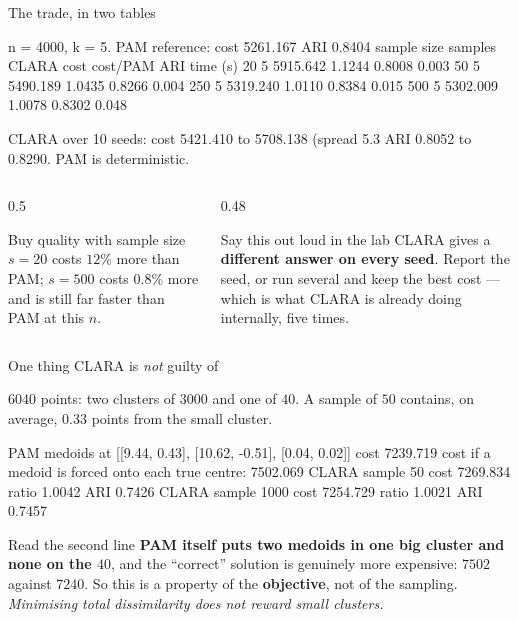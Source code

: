 \documentclass[aspectratio=169]{beamer}
\begin{document}
\begin{frame}[fragile,shrink=8]{The trade, in two tables}
\begin{outblk}
  n = 4000, k = 5.  PAM reference: cost 5261.167   ARI 0.8404
  sample size   samples   CLARA cost   cost/PAM     ARI    time (s)
           20         5     5915.642     1.1244  0.8008     0.003
           50         5     5490.189     1.0435  0.8266     0.004
          250         5     5319.240     1.0110  0.8384     0.015
          500         5     5302.009     1.0078  0.8302     0.048

  CLARA over 10 seeds: cost 5421.410 to 5708.138 (spread 5.3%
                       ARI 0.8052 to 0.8290.   PAM is deterministic.
\end{outblk}
  \vspace{0.2em}
  \begin{columns}[T]
    \begin{column}{0.5\textwidth}
      \begin{exampleblock}{Buy quality with sample size}
        \small $s = 20$ costs $12\%$ more than PAM; $s = 500$ costs
        $0.8\%$ more and is still far faster than PAM at this $n$.
      \end{exampleblock}
    \end{column}
    \begin{column}{0.48\textwidth}
      \begin{alertblock}{Say this out loud in the lab}
        \small CLARA gives a \textbf{different answer on every seed}. Report
        the seed, or run several and keep the best cost --- which is what
        CLARA is already doing internally, five times.
      \end{alertblock}
    \end{column}
  \end{columns}
\end{frame}

\begin{frame}[fragile,shrink=8]{One thing CLARA is \emph{not} guilty of}
  \begin{center}\small
    $6040$ points: two clusters of $3000$ and one of $40$. A sample of $50$
    contains, on average, $0.33$ points from the small cluster.
  \end{center}
\begin{outblk}
  PAM   medoids at [[9.44, 0.43], [10.62, -0.51], [0.04, 0.02]]  cost 7239.719
  cost if a medoid is forced onto each true centre:              7502.069
  CLARA sample   50  cost 7269.834  ratio 1.0042  ARI 0.7426
  CLARA sample 1000  cost 7254.729  ratio 1.0021  ARI 0.7457
\end{outblk}
  \vspace{0.3em}
  \begin{alertblock}{Read the second line}
    \centering
    \textbf{PAM itself puts two medoids in one big cluster and none on the
    $40$}, and the ``correct'' solution is genuinely more expensive:
    $7502$ against $7240$. So this is a property of the \textbf{objective},
    not of the sampling. \emph{Minimising total dissimilarity does not
    reward small clusters.}
  \end{alertblock}
\end{frame}
\end{document}
